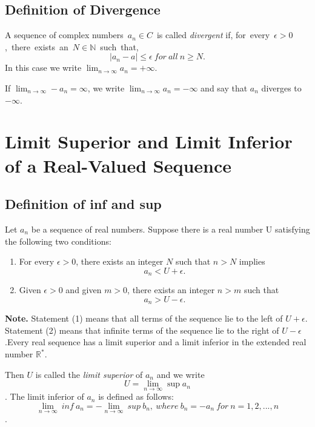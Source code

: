 \documentclass{article}
\begin{document}
\subsection{Definition of Divergence}
A sequence of complex numbers\ $a_{n}\in C$\ is called \textit{divergent} if,
for\ every\ $\epsilon>0$,\ there\ exists\ an\ $N\in\mathbb{N}$\ such\ that,
$$|a_{n}-a|\leq\epsilon\ for\ all\ n\geq N.$$
In this case we write $\lim_{n\rightarrow\infty}a_{n}=+\infty$.

If $\lim_{n\rightarrow\infty}-a_{n}=\infty$, we write $\lim_{n\rightarrow\infty}a_{n}=-\infty$ and say that $a_{n}$ 
diverges to $-\infty$. 

\section{Limit Superior and Limit Inferior of a Real-Valued Sequence}
\subsection{Definition of inf and sup}
Let ${a_{n}}$ be a sequence of real numbers. Suppose there is a real number U 
satisfying the following two conditions:

\begin{enumerate}
    \item For every $\epsilon > 0$, there exists an integer $N$ such that $n>N$ 
    implies $$a_{n}<U+\epsilon.$$
    \item Given $\epsilon>0$ and given $m>0$, there exists an integer $n>m$ such that 
    $$a_{n}>U-\epsilon.$$ 
\end{enumerate}

\textbf{Note.} Statement (1) means that all terms of the sequence lie to the left 
of $U+\epsilon$. Statement (2) means that infinite terms of the sequence lie to the 
right of $U-\epsilon$.Every real sequence has a limit superior and a limit inferior 
in the extended real number $\mathbb{R^{*}}$.

Then $U$ is called the \textit{limit superior} of ${a_{n}}$
and we write $$U=\lim_{n\rightarrow \infty}\sup{a_{n}}$$.
The limit inferior of ${a_{n}}$ is defined as follows:
$$\lim_{n\rightarrow \infty}\ inf\ a_{n}=-\lim_{n\rightarrow \infty}\ sup\ b_{n},\ where\ b_{n}=-a_{n}\ for\ n=1,2,...,n$$.
\end{document}
